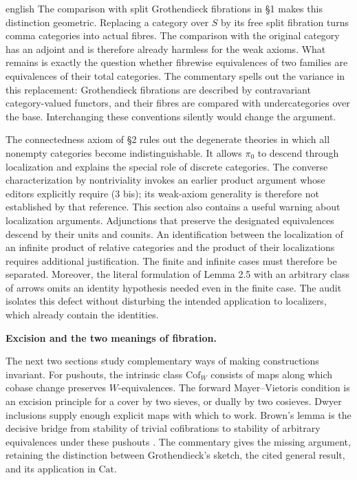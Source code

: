 \begin{otherlanguage*}{english}
The comparison with split Grothendieck fibrations in \S1 makes this distinction geometric. Replacing a category over $S$ by its free split fibration turns comma categories into actual fibres. The comparison with the original category has an adjoint and is therefore already harmless for the weak axioms. What remains is exactly the question whether fibrewise equivalences of two families are equivalences of their total categories. The commentary spells out the variance in this replacement: Grothendieck fibrations are described by contravariant category-valued functors, and their fibres are compared with undercategories over the base. Interchanging these conventions silently would change the argument.

The connectedness axiom of \S2 rules out the degenerate theories in which all nonempty categories become indistinguishable. It allows $\pi_0$ to descend through localization and explains the special role of discrete categories. The converse characterization by nontriviality invokes an earlier product argument whose editors explicitly require (3 bis); its weak-axiom generality is therefore not established by that reference. This section also contains a useful warning about localization arguments. Adjunctions that preserve the designated equivalences descend by their units and counits. An identification between the localization of an infinite product of relative categories and the product of their localizations requires additional justification. The finite and infinite cases must therefore be separated. Moreover, the literal formulation of Lemma 2.5 with an arbitrary class of arrows omits an identity hypothesis needed even in the finite case. The audit isolates this defect without disturbing the intended application to localizers, which already contain the identities.

\medskip\noindent\textbf{Excision and the two meanings of fibration.}

The next two sections study complementary ways of making constructions invariant. For pushouts, the intrinsic class $\mathrm{Cof}_W$ consists of maps along which cobase change preserves $W$-equivalences. The forward Mayer--Vietoris condition is an excision principle for a cover by two sieves, or dually by two cosieves. Dwyer inclusions supply enough explicit maps with which to work. Brown's lemma is the decisive bridge from stability of trivial cofibrations to stability of arbitrary equivalences under these pushouts \citep{Brown1973}. The commentary gives the missing argument, retaining the distinction between Grothendieck's sketch, the cited general result, and its application in $\mathrm{Cat}$.


\end{otherlanguage*}
